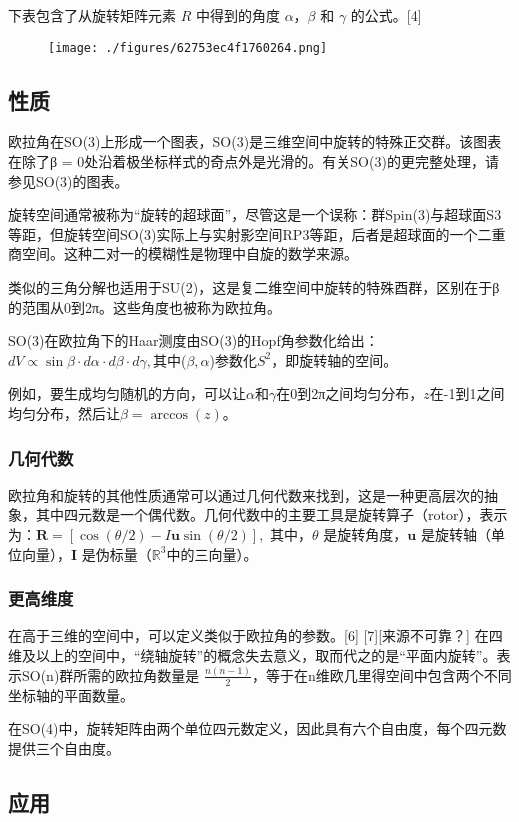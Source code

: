 下表包含了从旋转矩阵元素 \( R \) 中得到的角度 \(\alpha\)，\(\beta\) 和 \(\gamma\) 的公式。[4]
\begin{figure}[ht]
\centering
\texttt{[image: ./figures/62753ec4f1760264.png]}
\caption{} \label{fig_OLJ_12}
\end{figure}
\subsection{性质}
欧拉角在SO(3)上形成一个图表，SO(3)是三维空间中旋转的特殊正交群。该图表在除了β = 0处沿着极坐标样式的奇点外是光滑的。有关SO(3)的更完整处理，请参见SO(3)的图表。

旋转空间通常被称为“旋转的超球面”，尽管这是一个误称：群Spin(3)与超球面S3等距，但旋转空间SO(3)实际上与实射影空间RP3等距，后者是超球面的一个二重商空间。这种二对一的模糊性是物理中自旋的数学来源。

类似的三角分解也适用于SU(2)，这是复二维空间中旋转的特殊酉群，区别在于β的范围从0到2π。这些角度也被称为欧拉角。

SO(3)在欧拉角下的Haar测度由SO(3)的Hopf角参数化给出：\(dV \propto \sin \beta \cdot d\alpha \cdot d\beta \cdot d\gamma,\)其中(\(\beta, \alpha\))参数化\(S^2\)，即旋转轴的空间。

例如，要生成均匀随机的方向，可以让\(\alpha\)和\(\gamma\)在0到2π之间均匀分布，\(z\)在-1到1之间均匀分布，然后让\(\beta = \arccos(z)\)。
\subsubsection{几何代数}
欧拉角和旋转的其他性质通常可以通过几何代数来找到，这是一种更高层次的抽象，其中四元数是一个偶代数。几何代数中的主要工具是旋转算子（rotor），表示为：\(\mathbf{R} = [\cos(\theta / 2) - I\mathbf{u}\sin(\theta / 2)],\)
其中，\(\theta\) 是旋转角度，\(\mathbf{u}\) 是旋转轴（单位向量），\(\mathbf{I}\) 是伪标量（\(\mathbb{R}^3\)中的三向量）。
\subsubsection{更高维度}
在高于三维的空间中，可以定义类似于欧拉角的参数。[6] [7][来源不可靠？] 在四维及以上的空间中，“绕轴旋转”的概念失去意义，取而代之的是“平面内旋转”。表示SO(n)群所需的欧拉角数量是 \( \frac{n(n - 1)}{2} \)，等于在n维欧几里得空间中包含两个不同坐标轴的平面数量。

在SO(4)中，旋转矩阵由两个单位四元数定义，因此具有六个自由度，每个四元数提供三个自由度。
\subsection{应用}
